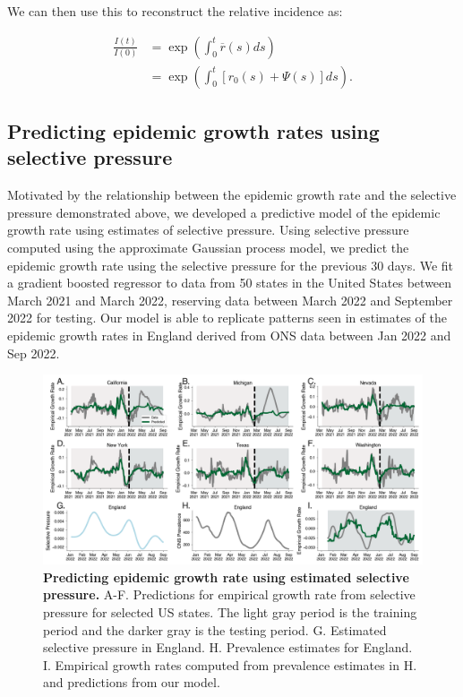 \documentclass[12pt,oneside,letterpaper]{article}
\begin{document}
We can then use this to reconstruct the relative incidence as:

\begin{align*}
    \frac{I(t)}{I(0)} &= \exp\left(\int_{0}^{t} \overline{r}(s) ds\right)\\
         &= \exp \left(\int_{0}^{t} [r_{0}(s) + \Psi(s)]ds \right).
\end{align*}

\subsection*{Predicting epidemic growth rates using selective pressure}%

Motivated by the relationship between the epidemic growth rate and the selective pressure demonstrated above, we developed a predictive model of the epidemic growth rate using estimates of selective pressure.
Using selective pressure computed using the approximate Gaussian process model, we predict the epidemic growth rate using the selective pressure for the previous 30 days.
We fit a gradient boosted regressor to data from 50 states in the United States between March 2021 and March 2022, reserving data between March 2022 and September 2022 for testing.
Our model is able to replicate patterns seen in estimates of the epidemic growth rates in England derived from ONS data between Jan 2022 and Sep 2022.


\begin{figure}[h]
    \centering
    \includegraphics[width=0.8\linewidth]{./figures/selective_pressure_prediction.png}
    \caption{\textbf{Predicting epidemic growth rate using estimated selective pressure.}
    A-F. Predictions for empirical growth rate from selective pressure for selected US states.
    The light gray period is the training period and the darker gray is the testing period.
    G. Estimated selective pressure in England.
    H. Prevalence estimates for England.
    I. Empirical growth rates computed from prevalence estimates in H. and predictions from our model.
}
    \label{fig:selective_pressure_prediction}
\end{figure}
\end{document}
